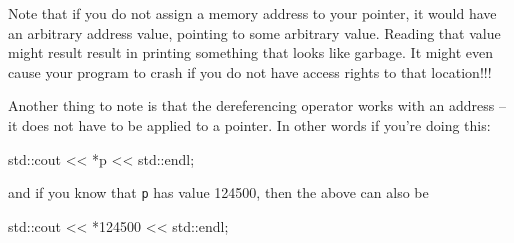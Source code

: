 Note that if you do not assign a memory address to your pointer, it would have an arbitrary address value, pointing to some arbitrary value.
Reading that value might result result in printing something that looks like garbage. It might even cause your program to crash if you do not have access rights to that location!!!

Another thing to note is that the dereferencing operator works with an address -- it does not have to be applied to a pointer. In other words if you're doing this:

\begin{consolethree}[escapeinside=||]
std::cout << *p << std::endl;
\end{consolethree}

and if you know that \texttt{p} has value 124500, then the above can also be

\begin{consolethree}[escapeinside=||]
std::cout << *124500 << std::endl;
\end{consolethree}



